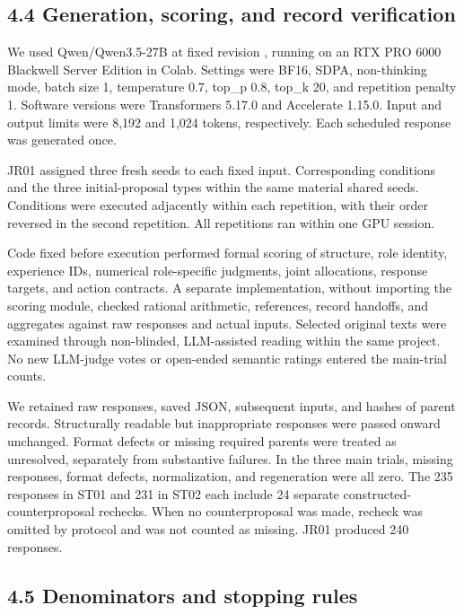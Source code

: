 \documentclass[10pt,a4paper]{article}
\begin{document}
\subsection{4.4 Generation, scoring, and record verification}\label{paper-03-generation-scoring-and-record-verification}

We used Qwen/Qwen3.5-27B at fixed revision \texttt{}, running on an RTX PRO 6000 Blackwell Server Edition in Colab. Settings were BF16, SDPA, non-thinking mode, batch size 1, temperature 0.7, top\_p 0.8, top\_k 20, and repetition penalty 1. Software versions were Transformers 5.17.0 and Accelerate 1.15.0. Input and output limits were 8,192 and 1,024 tokens, respectively. Each scheduled response was generated once.

JR01 assigned three fresh seeds to each fixed input. Corresponding conditions and the three initial-proposal types within the same material shared seeds. Conditions were executed adjacently within each repetition, with their order reversed in the second repetition. All repetitions ran within one GPU session.

Code fixed before execution performed formal scoring of structure, role identity, experience IDs, numerical role-specific judgments, joint allocations, response targets, and action contracts. A separate implementation, without importing the scoring module, checked rational arithmetic, references, record handoffs, and aggregates against raw responses and actual inputs. Selected original texts were examined through non-blinded, LLM-assisted reading within the same project. No new LLM-judge votes or open-ended semantic ratings entered the main-trial counts.

We retained raw responses, saved JSON, subsequent inputs, and hashes of parent records. Structurally readable but inappropriate responses were passed onward unchanged. Format defects or missing required parents were treated as unresolved, separately from substantive failures. In the three main trials, missing responses, format defects, normalization, and regeneration were all zero. The 235 responses in ST01 and 231 in ST02 each include 24 separate constructed-counterproposal rechecks. When no counterproposal was made, recheck was omitted by protocol and was not counted as missing. JR01 produced 240 responses.

\subsection{4.5 Denominators and stopping rules}\label{paper-03-denominators-and-stopping-rules}
\end{document}

